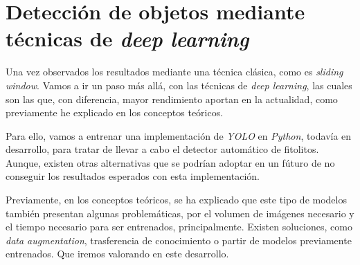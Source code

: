 \section{Detección de objetos mediante técnicas de \textit{deep learning}}

Una vez observados los resultados mediante una técnica clásica, como es \textit{sliding window}. Vamos a ir un paso más allá, con las técnicas de \textit{deep learning}, las cuales son las que,  con diferencia, mayor rendimiento aportan en la actualidad, como previamente he explicado en los conceptos teóricos.

Para ello, vamos a entrenar una implementación de \textit{YOLO} en \textit{Python}, todavía en desarrollo, para tratar de llevar a cabo el detector automático de fitolitos. Aunque, existen otras alternativas que se podrían adoptar en un fúturo de no conseguir los resultados esperados con esta implementación.

Previamente, en los conceptos teóricos, se ha explicado que este tipo de modelos también presentan algunas problemáticas, por el volumen de imágenes necesario y el tiempo necesario para ser entrenados, principalmente. Existen soluciones, como \textit{data augmentation}, trasferencia de conocimiento o partir de modelos previamente entrenados. Que iremos valorando en este desarrollo.